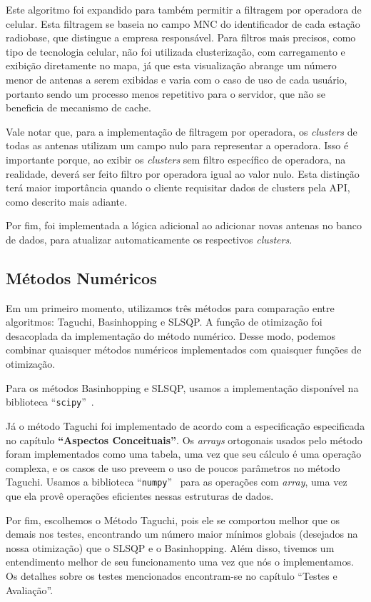 \documentclass[]{politex}
\begin{document}
Este algoritmo foi expandido para também permitir a filtragem por operadora de
celular. Esta filtragem se baseia no campo MNC do identificador de cada estação
radiobase, que distingue a empresa responsável. Para filtros mais precisos, como
tipo de tecnologia celular, não foi utilizada clusterização, com carregamento e
exibição diretamente no mapa, já que esta visualização abrange um número menor
de antenas a serem exibidas e varia com o caso de uso de cada usuário, portanto
sendo um processo menos repetitivo para o servidor, que não se beneficia de
mecanismo de cache.

Vale notar que, para a implementação de filtragem por operadora, os
\textit{clusters} de todas as antenas utilizam um campo nulo para representar a
operadora. Isso é importante porque, ao exibir os \textit{clusters} sem filtro
específico de operadora, na realidade, deverá ser feito filtro por operadora
igual ao valor nulo. Esta distinção terá maior importância quando o cliente
requisitar dados de clusters pela API, como descrito mais adiante.

Por fim, foi implementada a lógica adicional ao adicionar novas antenas no banco
de dados, para atualizar automaticamente os respectivos \textit{clusters}.

\subsection{Métodos Numéricos}

Em um primeiro momento, utilizamos três métodos para comparação entre
algoritmos: Taguchi, Basinhopping e SLSQP. A função de otimização foi
desacoplada da implementação do método numérico. Desse modo, podemos combinar
quaisquer métodos numéricos implementados com quaisquer funções de otimização.

Para os métodos Basinhopping e SLSQP, usamos a implementação disponível na
biblioteca ``\texttt{scipy}''~\cite{scipy}.

Já o método Taguchi foi implementado de acordo com a especificação especificada
no capítulo \textbf{``Aspectos Conceituais''}. Os \textit{arrays} ortogonais
usados pelo método foram implementados como uma tabela, uma vez que seu cálculo
é uma operação complexa, e os casos de uso preveem o uso de poucos parâmetros no
método Taguchi. Usamos a biblioteca ``\texttt{numpy}''~\cite{numpy} para as
operações com \textit{array}, uma vez que ela provê operações eficientes nessas
estruturas de dados.

Por fim, escolhemos o Método Taguchi, pois ele se comportou melhor que os demais
nos testes, encontrando um número maior mínimos globais (desejados na nossa
otimização) que o SLSQP e o Basinhopping. Além disso, tivemos um entendimento
melhor de seu funcionamento uma vez que nós o implementamos. Os detalhes sobre
os testes mencionados encontram-se no capítulo ``Testes e Avaliação''.
\end{document}
